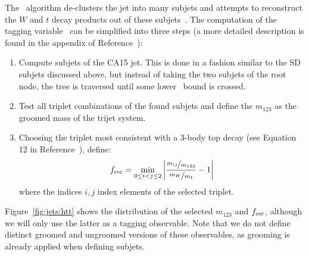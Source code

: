 The \HTT~algorithm de-clusters the jet into many subjets and attempts to reconstruct the $W$ and $t$ decay products out of these subjets~\cite{htt}.
The computation of the tagging variable \frec~can be simplified into three steps (a more detailed description is found in the appendix of Reference~\cite{htt}):
\begin{enumerate}
    \item Compute subjets of the CA15 jet. This is done in a fashion similar to the SD subjets discussed above, but instead of taking the two subjets of the root node, the tree is traversed until some lower \pt~bound is crossed.
    \item Test all triplet combinations of the found subjets and define the $m_{123}$ as the groomed mass of the trijet system. 
    \item Choosing the triplet most consistent with a 3-body top decay (see Equation 12 in Reference~\cite{htt}), define:
        \begin{equation}
            f_\mathrm{rec} = \min_{0\leq i < j \leq 2} \left|
            \frac{\nicefrac{m_{ij}}{m_{123}}}{\nicefrac{m_W}{m_t}} - 1\right|
        \end{equation}
        where the indices $i,j$ index elements of the selected triplet. 
\end{enumerate}
Figure~\ref{fig:jets:htt} shows the distribution of the selected $m_{123}$ and $f_\mathrm{rec}$, although we will only use the latter as a tagging observable. 
Note that we do not define distinct groomed and ungroomed versions of these observables, as grooming is already applied when defining subjets. 

